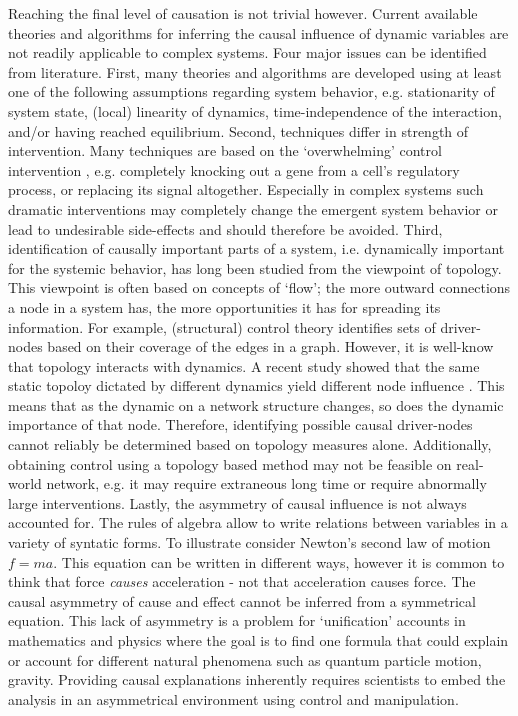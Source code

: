 \documentclass[twoside, twocolumn]{article}
\begin{document}
	Reaching the final level of causation is not trivial however. Current available theories and algorithms for inferring the causal influence of dynamic variables are not readily applicable to complex systems. Four major issues can be identified from literature. First, many theories and algorithms are developed using at least one of the following assumptions regarding system behavior, e.g. stationarity of system state, (local) linearity of dynamics\cite{Chen2017, Liu2016a}, time-independence of the interaction, and/or having reached equilibrium. Second, techniques differ in strength of intervention. Many techniques are based on the `overwhelming' control intervention \cite{Chen2017}, e.g. completely knocking out a gene from a cell's regulatory process, or replacing its signal altogether. Especially in complex systems such dramatic interventions may completely change the emergent system behavior or lead to undesirable side-effects and should therefore be avoided. 
	Third, identification of causally important parts of a system, i.e. dynamically important for the systemic behavior, has long been studied from the viewpoint of topology\cite{Harush2017a,Sikic2013,Cowan2012, Muldoon2016, Yan2017, Pequito2017}. This viewpoint is often based on concepts of `flow'; the more outward connections a node in a system has, the more opportunities it has for spreading its information. For example, (structural) control theory identifies sets of driver-nodes based on their coverage of the edges in a graph. However, it is well-know that topology interacts with dynamics\cite{Cowan2012, Harush2017a, Gates2016}. A recent study showed that the same static topoloy dictated by different dynamics yield different node influence \cite{Harush2017a}. This means that as the dynamic on a network structure changes, so does the dynamic importance of that node. Therefore, identifying possible causal driver-nodes cannot reliably be determined based on topology measures alone. Additionally, obtaining control using a topology based method may not be feasible on real-world network, e.g. it may require extraneous long time \cite{Pequito2017} or require abnormally large interventions\cite{Cowan2012, Yan2012}.
	Lastly, the asymmetry of causal influence is not always accounted for. The rules of algebra allow to write relations between variables in a variety of syntatic forms. To illustrate consider Newton's second law of motion $f = m a$. This equation can be written in different ways, however it is common to think that force \textit{causes} acceleration - not that acceleration causes force. The causal asymmetry of cause and effect cannot be inferred from a symmetrical equation. This lack of asymmetry is a problem for `unification' accounts in mathematics and physics where the goal is to find one formula that could explain or account for different natural phenomena such as quantum particle motion, gravity. Providing causal explanations inherently requires scientists to embed the analysis in an asymmetrical environment using control and manipulation. 
	
\end{document}
